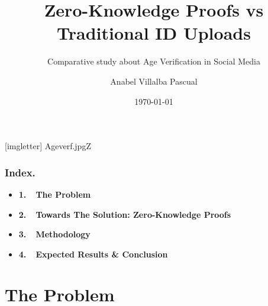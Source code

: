 \documentclass[aspectratio=169]{beamer}
\title{Zero-Knowledge Proofs vs Traditional ID Uploads}
\subtitle{Comparative study about Age Verification in Social Media}
\author{Anabel Villalba Pascual}
\date{\today}
\begin{document}
    
    {
        [imgletter]
        {Ageverf.jpg}{Z}
        
        \begin{frame}
            \maketitle
        \end{frame}
    }
    
    \begin{frame}
    \frametitle{Index.}
    
    \begin{itemize}
        \setlength{\itemsep}{1em}
        \item[] \textbf{\large \textcolor{hgpink}{1.\ \ The Problem}}
        \item[] \textbf{\large \textcolor{hgdarkgreen}{2.\ \ Towards The Solution: Zero-Knowledge Proofs}}
        \item[] \textbf{\large \textcolor{hgpurple}{3.\ \ Methodology}}
        \item[] \textbf{\large \textcolor{hgblue}{4.\ \ Expected Results \& Conclusion}}
    \end{itemize}
    
    \end{frame}


    
    
    \section{\textcolor{hgpink}{The Problem}}
    
\end{document}
